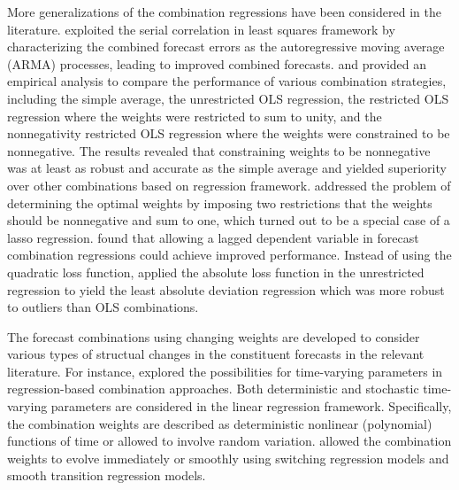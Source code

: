 \documentclass[11pt]{article}
\begin{document}
More generalizations of the combination regressions have been considered in the literature. \cite{Diebold1988-sx} exploited the serial correlation in least squares framework by characterizing the combined forecast errors as the autoregressive moving average (ARMA) processes, leading to improved combined forecasts. \cite{Gunter1992-go} and \cite{Aksu1992-lb} provided an empirical analysis to compare the performance of various combination strategies, including the simple average, the unrestricted OLS regression, the restricted OLS regression where the weights were restricted to sum to unity, and the nonnegativity restricted OLS regression where the weights were constrained to be nonnegative. The results revealed that constraining weights to be nonnegative was at least as robust and accurate as the simple average and yielded superiority over other combinations based on regression framework. \cite{Conflitti2015-fq} addressed the problem of determining the optimal weights by imposing two restrictions that the weights should be nonnegative and sum to one, which turned out to be a special case of a lasso regression. \cite{Edward_Coulson1993-db} found that allowing a lagged dependent variable in forecast combination regressions could achieve improved performance. Instead of using the quadratic loss function, \cite{Nowotarski2014-ev} applied the absolute loss function in the unrestricted regression to yield the least absolute deviation regression which was more robust to outliers than OLS combinations.

The forecast combinations using changing weights are developed to consider various types of structual changes in the constituent forecasts in the relevant literature. For instance, \cite{Diebold1987-go} explored the possibilities for time-varying parameters in regression-based combination approaches. Both deterministic and stochastic time-varying parameters are considered in the linear regression framework. Specifically, the combination weights are described as deterministic nonlinear (polynomial) functions of time or allowed to involve random variation. \cite{Deutsch1994-ob} allowed the combination weights to evolve immediately or smoothly using switching regression models and smooth transition regression models.
\end{document}
